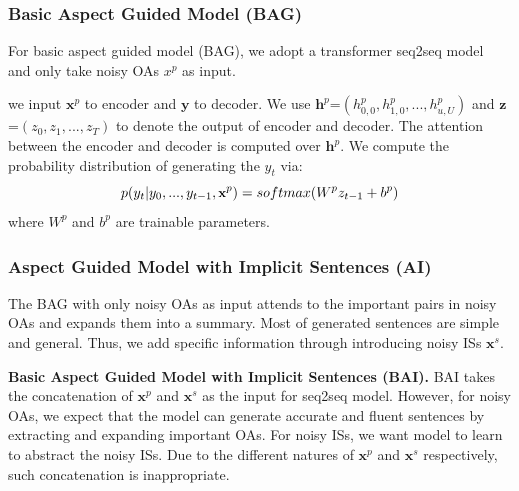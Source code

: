 {\subsubsection{Basic Aspect Guided Model (BAG)}
For basic aspect guided model (BAG), 
we adopt a transformer seq2seq model~\cite{Transformer17}
and only take noisy OAs $x^p$ as input.

we input
$\textbf{x}^p$
to encoder 
and  
$\textbf{y}$
to decoder.
We use $\textbf{h}^p$=$(h^p_{0,0}, h^p_{1,0},...,h^p_{u,U})$ and 
$\textbf{z}$=$(z_0, z_1,...,z_T)$ to denote the output of encoder and decoder.
The attention between the encoder and decoder is computed over $\textbf{h}^p$.
We compute the probability distribution of 
generating the $y_t$ via:
\begin{equation}
\small
p(y_t|y_0,...,y_{t-1}, \textbf{x}^p)=softmax(W^pz_{t-1}+b^p)
\label{eq:decode}
\end{equation}
where $W^p$ and $b^p$ are trainable parameters.

\subsubsection{Aspect Guided Model with Implicit Sentences (AI)}
The BAG with only noisy OAs as input attends to the important pairs in noisy OAs
and expands them into a summary.
Most of generated sentences are simple and general.
Thus, we add specific information through introducing noisy ISs $\textbf{x}^s$.

\textbf{Basic Aspect Guided Model with Implicit Sentences (BAI).} 
BAI takes the concatenation of $\textbf{x}^p$ and $\textbf{x}^s$
as the input for seq2seq model. 
However, for noisy OAs, we expect that the model can generate accurate and fluent
sentences by extracting and expanding important OAs.
For noisy ISs, we want model to learn to abstract the noisy ISs.
Due to the different natures of $\textbf{x}^p$ and $\textbf{x}^s$ respectively, 
such concatenation is inappropriate.

}
